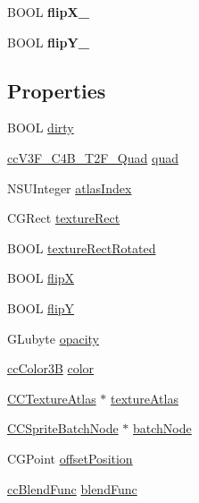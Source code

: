 \begin{DoxyCompactItemize}
\item 
\hypertarget{class_c_c_sprite_ae66473fd27ad6efac9d630b775f71d61}{B\-O\-O\-L {\bfseries flip\-X\-\_\-}}\label{class_c_c_sprite_ae66473fd27ad6efac9d630b775f71d61}

\item 
\hypertarget{class_c_c_sprite_ad0c2fb2ab21e7d7ad62cee6a8c445e42}{B\-O\-O\-L {\bfseries flip\-Y\-\_\-}}\label{class_c_c_sprite_ad0c2fb2ab21e7d7ad62cee6a8c445e42}

\end{DoxyCompactItemize}
\subsection*{Properties}
\begin{DoxyCompactItemize}
\item 
B\-O\-O\-L \hyperlink{class_c_c_sprite_aa7ae3de20f2ba27c475b504021a7bbdd}{dirty}
\item 
\hyperlink{cc_types_8h_ab2642984bbb3d2fa1fe4fedb5657a065}{cc\-V3\-F\-\_\-\-C4\-B\-\_\-\-T2\-F\-\_\-\-Quad} \hyperlink{class_c_c_sprite_aa7320418535244fb729d1bbb7b692deb}{quad}
\item 
N\-S\-U\-Integer \hyperlink{class_c_c_sprite_a938e0ab857573e110dc751438dc7a152}{atlas\-Index}
\item 
C\-G\-Rect \hyperlink{class_c_c_sprite_aa793e1433058539e5664ffd3533ab928}{texture\-Rect}
\item 
B\-O\-O\-L \hyperlink{class_c_c_sprite_ae36ca8caa7122797c7ece2eb6f9d3182}{texture\-Rect\-Rotated}
\item 
B\-O\-O\-L \hyperlink{class_c_c_sprite_a8b3b3793750b2ffadfd4764da13f5a21}{flip\-X}
\item 
B\-O\-O\-L \hyperlink{class_c_c_sprite_ad1d4948982c1e8e2cb22be6e916435e1}{flip\-Y}
\item 
G\-Lubyte \hyperlink{class_c_c_sprite_a1fbf07d9d812aea2002d836c95b675cb}{opacity}
\item 
\hyperlink{cc_types_8h_a829b00c53e72f0115e3880cb508fec1e}{cc\-Color3\-B} \hyperlink{class_c_c_sprite_ab7c1fe8d2419d19873095f2070d758f5}{color}
\item 
\hyperlink{interface_c_c_texture_atlas}{C\-C\-Texture\-Atlas} $\ast$ \hyperlink{class_c_c_sprite_ad56b246727da63664eb32498d2fccb7f}{texture\-Atlas}
\item 
\hyperlink{interface_c_c_sprite_batch_node}{C\-C\-Sprite\-Batch\-Node} $\ast$ \hyperlink{class_c_c_sprite_acc65ff763f10a476243cfe34e8388d14}{batch\-Node}
\item 
C\-G\-Point \hyperlink{class_c_c_sprite_a78652c4a769da10893cb53fc4121c6cd}{offset\-Position}
\item 
\hyperlink{cc_types_8h_a8c19c6f67219ecc0a6e4740cc046008d}{cc\-Blend\-Func} \hyperlink{class_c_c_sprite_af0c786f0f5b4081a4524e78eda9c8734}{blend\-Func}
\end{DoxyCompactItemize}


